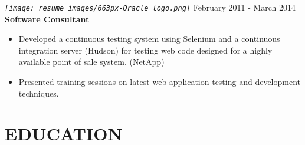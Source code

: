 \documentclass[12pt, line, margin]{res}
\begin{document}
\begin{resume}
            {\sl
              \texttt{[image: resume\_images/663px-Oracle\_logo.png]}
            }
            \hfill            February 2011 - March 2014 \\
            \textbf{Software Consultant}
            \begin{itemize}  \itemsep -2pt %
              \item   Developed a continuous testing system using Selenium
                          and a continuous integration server (Hudson) for testing web code designed
                          for a highly available point of sale system. (NetApp)
              \item   Presented training sessions on latest web application testing \newline
                          and development techniques.
            \end{itemize}

        \section{EDUCATION}
            \begin{multicols}{2} {
            }

            {
            }
            \end{multicols}


\end{resume}
\end{document}
